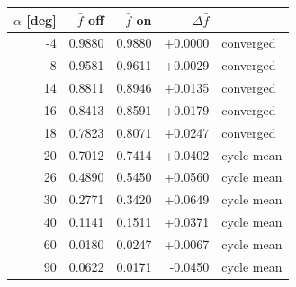 \begin{tabular}{rrrrl}
  \hline
  $\alpha$ [deg] & $\bar{f}$ off & $\bar{f}$ on & $\Delta \bar{f}$ & \\
  \hline
  -4 & 0.9880 & 0.9880 & +0.0000 & converged \\
  8 & 0.9581 & 0.9611 & +0.0029 & converged \\
  14 & 0.8811 & 0.8946 & +0.0135 & converged \\
  16 & 0.8413 & 0.8591 & +0.0179 & converged \\
  18 & 0.7823 & 0.8071 & +0.0247 & converged \\
  20 & 0.7012 & 0.7414 & +0.0402 & cycle mean \\
  26 & 0.4890 & 0.5450 & +0.0560 & cycle mean \\
  30 & 0.2771 & 0.3420 & +0.0649 & cycle mean \\
  40 & 0.1141 & 0.1511 & +0.0371 & cycle mean \\
  60 & 0.0180 & 0.0247 & +0.0067 & cycle mean \\
  90 & 0.0622 & 0.0171 & -0.0450 & cycle mean \\
  \hline
\end{tabular}
